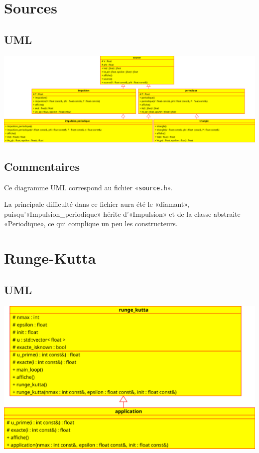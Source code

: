 \documentclass{report}
\begin{document}
\chapter{Sources}
    \begin{multicols}{2}
        \section{UML}
            \includegraphics[width=\linewidth+\linewidth,angle=90]{images/sources_large}

        \section{Commentaires}
            Ce diagramme UML correspond au fichier «\verb|source.h|».

            La principale difficulté dans ce fichier aura été le «diamant», puisqu’«Impulsion\_periodique» hérite
            d’«Impulsion» et de la classe abstraite «Periodique», ce qui complique un peu les constructeurs.

    \end{multicols}

\chapter{Runge-Kutta}
    \section{UML}
        \includegraphics{images/runge_kutta_alone}
\end{document}
